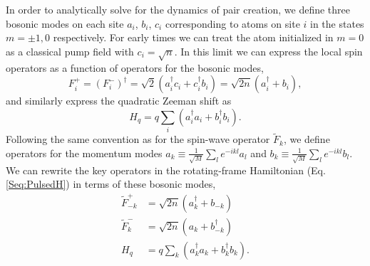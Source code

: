 \begin{bibunit}
In order to analytically solve for the dynamics of pair creation, we define three bosonic modes on each site $a_i$, $b_i$, $c_i$ corresponding to atoms on site $i$ in the states $m = \pm 1,0$ respectively. For early times we can treat the atom initialized in $m=0$ as a classical pump field with $c_i = \sqrt{n}$. In this limit we can  express the local spin operators as a function of operators for the bosonic modes,
\begin{equation}\label{eq:Fbosonic}
F_i^+ = (F_i^-)^\dagger = \sqrt{2}  \left(a_i^\dagger c_i + c_i^\dagger b_i \right) =  \sqrt{2n} \left(a_i^\dagger + b_i \right),
\end{equation}
and similarly express the quadratic Zeeman shift as
\begin{equation}
H_q = q \sum_i \left(a_i^\dagger a_i + b_i^\dagger b_i\right).
\end{equation}
Following the same convention as for the spin-wave operator $\tilde{F}_k$, we define operators for the momentum modes $a_k \equiv \frac{1}{\sqrt{M}} \sum_l e^{-ikl} a_l$ and $b_k \equiv \frac{1}{\sqrt{M}} \sum_l e^{-ikl} b_l$. We can rewrite the key operators in the rotating-frame Hamiltonian (Eq. \eqref{Seq:PulsedH}) in terms of these bosonic modes,
\begin{equation}
\begin{aligned}
\tilde{F}_{-k}^+ &= \sqrt{2n} \left(a_k^\dagger + b_{-k} \right) \\
\tilde{F}_k^- &= \sqrt{2n} \left(a_k + b_{-k}^\dagger \right) \\
H_q &= q \sum_k \left(a_k^\dagger a_k + b_k^\dagger b_k\right).
\end{aligned}
\end{equation}


\end{bibunit}

